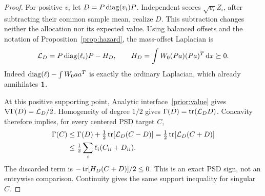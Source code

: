 \begin{proof}
For positive $v_i$ let $D=P\operatorname{diag}(v_i)P$. Independent scores
$\sqrt{v_i}Z_i$, after subtracting their common sample mean, realize
$D$. This subtraction changes neither the allocation nor its expected
value. Using balanced offsets and the notation of
Proposition~\ref{prop:hazard}, the mass-offset Laplacian is
\begin{equation}\label{eq:hazard-matrix}
 \mathcal L_D=P\operatorname{diag}(\ell_i)P-H_D,\qquad
 H_D=\int W_0(Pa)(Pa)^T\,\mathrm d x\succeq0.
\end{equation}
Indeed $\operatorname{diag}(\ell)-\int W_0aa^T$ is exactly the ordinary Laplacian,
which already annihilates $\mathbf 1$.

At this positive supporting point, Analytic interface~\ref{prior:value} gives
$\nabla\Gamma(D)=\mathcal L_D/2$. Homogeneity of degree $1/2$ gives
$\Gamma(D)=\operatorname{tr}(\mathcal L_DD)$. Concavity therefore implies, for every
centered PSD target $C$,
\begin{align}
 \Gamma(C)&\le\Gamma(D)+\tfrac12\operatorname{tr}[\mathcal L_D(C-D)]
       =\tfrac12\operatorname{tr}[\mathcal L_D(C+D)]\notag\\
       &\le\tfrac12\sum_i\ell_i(C_{ii}+D_{ii}).
       \label{eq:support}
\end{align}
The discarded term is $-\operatorname{tr}[H_D(C+D)]/2\le0$.
This is an exact PSD sign, not an entrywise comparison. Continuity
gives the same support inequality for singular $C$.


\end{proof}

